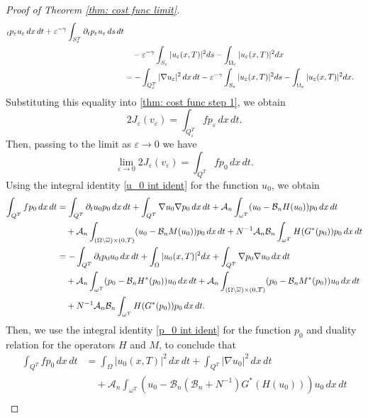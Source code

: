 \documentclass[reqno]{amsart}
\begin{document}
\begin{proof}[Proof of Theorem \ref{thm: cost func limit}]
\begin{align*}
_{t}p_{\varepsilon }u_{\varepsilon }\,dx\,dt+\varepsilon ^{-\gamma }\int
_{S_{\varepsilon }^{T}}\partial _{t}p_{\varepsilon }u_{\varepsilon }{%
\,ds\,dt} \\
&\quad -\varepsilon ^{-\gamma }\int _{S_{\varepsilon }}|u_{\varepsilon
}(x,T)|^2{ds}-\int _{\Omega_{\varepsilon }}|u_{\varepsilon
}(x,T)|^2{dx} \\
&=-\int _{Q_{\varepsilon }^{T}}|\nabla u_{\varepsilon }|^2\,dx\,dt%
-\varepsilon ^{-\gamma }\int _{S_{\varepsilon }}|u_{\varepsilon
}(x,T)|^2{ds}-\int _{\Omega_{\varepsilon }}|u_{\varepsilon
}(x,T)|^2{dx}.
\end{align*}
Substituting this equality into \eqref{thm: cost func step 1}, we obtain
\[
2J_{\varepsilon }(v_{\varepsilon })=\int _{Q_{\varepsilon
}^{T}}fp_{\varepsilon }\,dx\,dt.
\]
Then, passing to the limit as $\varepsilon \to 0$ we have
\[
\lim _{\varepsilon \to 0}2J_{\varepsilon }(v_{\varepsilon})
=\int _{Q^{T}}fp_0\,dx\,dt.
\]%
Using the integral identity \eqref{u_0 int ident} for the function $u_0$,
we obtain
\begin{align*}
\int _{Q^{T}}fp_0\,dx\,dt
&=\int _{Q^{T}}\partial _{t}u_0p_0{%
\,dx\,dt}+\int _{Q^{T}}\nabla u_0\nabla p_0\,dx\,dt+\mathcal{A}_n\int
_{\omega ^{T}}(u_0-\mathcal{B}_nH(u_0))p_0\,dx\,dt \\
&\quad +\mathcal{A}_n\int _{(\Omega \setminus \overline{\omega })\times
(0,T)}(u_0-\mathcal{B}_nM(u_0))p_0\,dx\,dt+N^{-1}\mathcal{A}_n%
\mathcal{B}_n\int _{\omega ^{T}}H(G^{\ast }(p_0))p_0\,dx\,dt \\
&=-\int _{Q^{T}}\partial _{t}p_0u_0\,dx\,dt+\int _{\Omega
}|u_0(x,T)|^2{dx}+\int _{Q^{T}}\nabla p_0\nabla u_0\,dx\,dt \\
&\quad +\mathcal{A}_n\int _{\omega ^{T}}(p_0-\mathcal{B}_nH^{\ast
}(p_0))u_0\,dx\,dt+\mathcal{A}_n\int _{(\Omega \setminus
\overline{\omega })\times (0,T)}(p_0-\mathcal{B}_nM^{\ast }(p_0))u_0{%
\,dx\,dt} \\
&\quad +N^{-1}\mathcal{A}_n\mathcal{B}_n\int _{\omega ^{T}}H(G^{\ast
}(p_0))p_0\,dx\,dt.
\end{align*}
Then, we use the integral identity \eqref{p_0 int ident} for the function
$p_0$ and duality relation for the operators $H$ and $M$, to conclude that
\begin{align*}
\int _{Q^{T}}fp_0\,dx\,dt
&=\int _{\Omega }|u_0(x,T)|^2\,dx\,dt%
+\int _{Q^{T}}|\nabla u_0|^2\,dx\,dt \\
&\quad +\mathcal{A}_n\int _{\omega ^{T}}(u_0-\mathcal{B}_n(\mathcal{B}%
_n+N^{-1})G^{\ast }(H(u_0)))u_0\,dx\,dt \\

\end{align*}
\end{proof}
\end{document}
